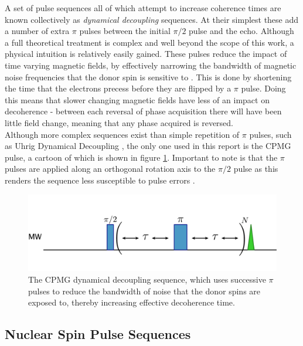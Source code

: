 A set of pulse sequences all of which attempt to increase coherence times are known collectively as \emph{dynamical decoupling} sequences.
At their simplest these add a number of extra $\pi$ pulses between the initial $\pi/2$ pulse and the echo.
Although a full theoretical treatment is complex and well beyond the scope of this work, a physical intuition is relatively easily gained.
These pulses reduce the impact of time varying magnetic fields, by effectively narrowing the bandwidth of magnetic noise frequencies that the donor spin is sensitive to \cite{Wang2009}. 
This is done by shortening the time that the electrons precess before they are flipped by a $\pi$ pulse. 
Doing this means that slower changing magnetic fields have less of an impact on decoherence - between each reversal of phase acquisition there will have been little field change, meaning that any phase acquired is reversed.
\\
Although more complex sequences exist than simple repetition of $\pi$ pulses, such as Uhrig Dynamical Decoupling \cite{Uhrig2008}, the only one used in this report is the CPMG pulse, a cartoon of which is shown in figure \ref{fig:CPMGpulse}.
Important to note is that the $\pi$ pulses are applied along an orthogonal rotation axis to the $\pi/2$ pulse as this renders the sequence less susceptible to pulse errors \cite{Carr1954,Meiboom1958}.


\begin{figure}
\centering
\includegraphics[width=\columnwidth]{Figures/CPMG.pdf}
\caption[CPMG pulse sequence]{The CPMG dynamical decoupling sequence, which uses successive $\pi$ pulses to reduce the bandwidth of noise that the donor spins are exposed to, thereby increasing effective decoherence time.}
\label{fig:CPMGpulse}
\end{figure}

\subsection{Nuclear Spin Pulse Sequences}

